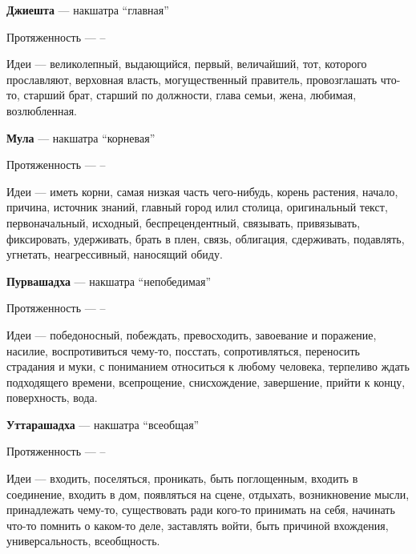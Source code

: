 \begin{myenum}
\begin{mydescr}
		\end{mydescr}
	\item \textbf{Джиешта} --- накшатра ``главная''
		\begin{mydescr}
			\item[Протяженность] ---  -- 
			\item[Идеи] --- великолепный, выдающийся, первый, величайший, тот, которого прославляют, верховная власть, могущественный правитель, провозглашать что-то, старший брат, старший по должности, глава семьи, жена, любимая, возлюбленная.
		\end{mydescr}
	\item \textbf{Мула} --- накшатра ``корневая''
		\begin{mydescr}
			\item[Протяженность] ---  -- \signum{13}{20}{\sagittarius}
			\item[Идеи] --- иметь корни, самая низкая часть чего-нибудь, корень растения, начало, причина, источник знаний, главный город илил столица, оригинальный текст, первоначальный, исходный, беспрецендентный, связывать, привязывать, фиксировать, удерживать, брать в плен, связь, облигация, сдерживать, подавлять, угнетать, неагрессивный, наносящий обиду.
		\end{mydescr}
	\item \textbf{Пурвашадха} --- накшатра ``непобедимая''
		\begin{mydescr}
			\item[Протяженность] ---  -- \signum{26}{40}{\sagittarius}
			\item[Идеи] --- победоносный, побеждать, превосходить, завоевание и поражение, насилие, воспротивиться чему-то, посстать, сопротивляться, переносить страдания и муки, с пониманием относиться к любому человека, терпеливо ждать подходящего времени, всепрощение, снисхождение, завершение, прийти к концу, поверхность, вода.
		\end{mydescr}
	\item \textbf{Уттарашадха} --- накшатра ``всеобщая''
		\begin{mydescr}
			\item[Протяженность] ---  -- \signum{10}{}{\capricornus}
			\item[Идеи] --- входить, поселяться, проникать, быть поглощенным, входить в соединение, входить в дом, появляться на сцене, отдыхать, возникновение мысли, принадлежать чему-то, существовать ради кого-то принимать на себя, начинать что-то помнить о каком-то деле, заставлять войти, быть причиной вхождения, универсальность, всеобщность.

\end{mydescr}
\end{myenum}
